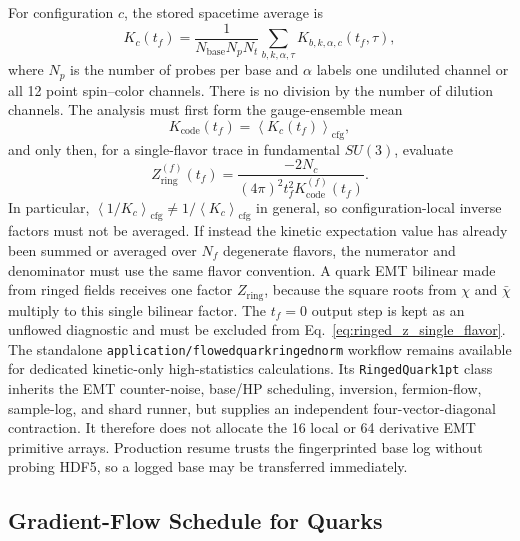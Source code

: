 \documentclass[11pt,a4paper]{article}
\newcommand{\code}[1]{\texttt{\begingroup\def\_{\textunderscore\allowbreak}#1\endgroup}}
\newcommand{\Tf}{t_f}
\begin{document}
For configuration \(c\), the stored spacetime average is
\begin{equation}
  K_c(\Tf)=\frac{1}{N_{\mathrm{base}}N_pN_t}
  \sum_{b,k,\alpha,\tau}K_{b,k,\alpha,c}(\Tf,\tau),
\end{equation}
where \(N_p\) is the number of probes per base and \(\alpha\) labels one
undiluted channel or all 12 point spin--color channels. There is no division
by the number of dilution channels.
The analysis must first form the gauge-ensemble mean
\begin{equation}
  K_{\mathrm{code}}(\Tf)=\left\langle K_c(\Tf)\right\rangle_{\mathrm{cfg}},
  \label{eq:ringed_k_code}
\end{equation}
and only then, for a single-flavor trace in fundamental \(SU(3)\), evaluate
\begin{equation}
  Z_{\mathrm{ring}}^{(f)}(\Tf)
  =
  \frac{-2N_c}
       {(4\pi)^2 \Tf^2 K_{\mathrm{code}}^{(f)}(\Tf)}.
  \label{eq:ringed_z_single_flavor}
\end{equation}
In particular,
\(\left\langle 1/K_c\right\rangle_{\mathrm{cfg}}\neq
1/\left\langle K_c\right\rangle_{\mathrm{cfg}}\) in general, so
configuration-local inverse factors must not be averaged.
If instead the kinetic expectation value has already been summed or averaged
over \(N_f\) degenerate flavors, the numerator and denominator must use the same
flavor convention.  A quark EMT bilinear made from ringed fields receives one
factor \(Z_{\mathrm{ring}}\), because the square roots from \(\chi\) and
\(\bar\chi\) multiply to this single bilinear factor.  The \(\Tf=0\) output step
is kept as an unflowed diagnostic and must be excluded from Eq.~\eqref{eq:ringed_z_single_flavor}.
The standalone \code{application/flowed\_quark\_ringed\_norm} workflow remains
available for dedicated kinetic-only high-statistics calculations.  Its
\code{RingedQuark1pt} class inherits the EMT counter-noise, base/HP scheduling,
inversion, fermion-flow, sample-log, and shard runner, but supplies an
independent four-vector-diagonal contraction.  It therefore does not allocate
the 16 local or 64 derivative EMT primitive arrays.  Production resume trusts
the fingerprinted base log without probing HDF5, so a logged base may be
transferred immediately.

\subsection{Gradient-Flow Schedule for Quarks}
\end{document}
